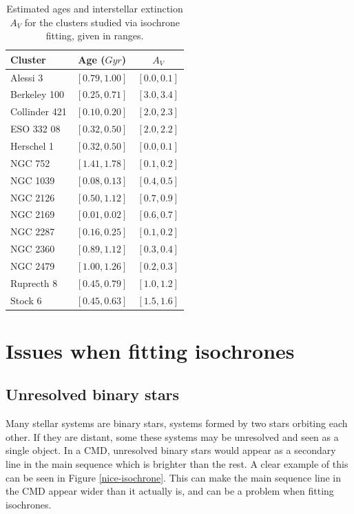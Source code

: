 \documentclass[twocolumn]{revtex4}
\begin{document}
\begin{table}[h!]
\begin{tabular}{|l|c|c|}
\hline
\textbf{Cluster} & \textbf{Age ($\si{Gyr}$)} & \textbf{$A_V$} \\
\hline
Alessi 3 & $[0.79, 1.00]$ & $[0.0, 0.1]$ \\
\hline
Berkeley 100 & $[0.25, 0.71]$ & $[3.0, 3.4]$ \\
\hline
Collinder 421 & $[0.10, 0.20]$ & $[2.0, 2.3]$ \\
\hline
ESO 332 08 & $[0.32, 0.50]$ & $[2.0, 2.2]$ \\
\hline
Herschel 1 & $[0.32, 0.50]$ & $[0.0, 0.1]$  \\
\hline
NGC 752 & $[1.41, 1.78]$ & $[0.1, 0.2]$  \\
\hline
NGC 1039 & $[0.08, 0.13]$ & $[0.4, 0.5]$  \\
\hline
NGC 2126 & $[0.50, 1.12]$ & $[0.7, 0.9]$ \\
\hline
NGC 2169 & $[0.01, 0.02]$ & $[0.6, 0.7]$ \\
\hline
NGC 2287 & $[0.16, 0.25]$ & $[0.1, 0.2]$ \\
\hline
NGC 2360 & $[0.89, 1.12]$ & $[0.3, 0.4]$ \\
\hline
NGC 2479 & $[1.00, 1.26]$ & $[0.2, 0.3]$ \\
\hline
Ruprecth 8 & $[0.45, 0.79]$ & $[1.0, 1.2]$ \\
\hline
Stock 6 & $[0.45, 0.63]$ & $[1.5, 1.6]$ \\
\hline
\end{tabular}
\caption{Estimated ages and interstellar extinction $A_V$ for the clusters studied via isochrone fitting, given in ranges.}
\label{tab:fitting-results}
\end{table}

\section{Issues when fitting isochrones}
\subsection{Unresolved binary stars}
Many stellar systems are binary stars, systems formed by two stars orbiting each other. If they are distant, some these systems may be unresolved and seen as a single object. In a CMD, unresolved binary stars would appear as a secondary line in the main sequence which is brighter than the rest. A clear example of this can be seen in Figure \ref{nice-isochrone}. This can make the main sequence line in the CMD appear wider than it actually is, and can be a problem when fitting isochrones.
\end{document}
